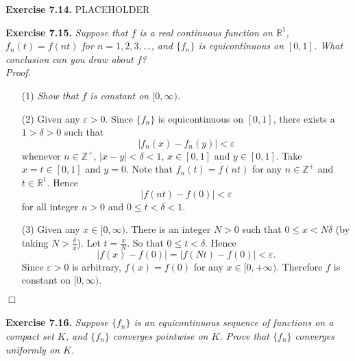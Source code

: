 \documentclass{article}
\begin{document}



\textbf{Exercise 7.14.}
PLACEHOLDER






\textbf{Exercise 7.15.}
\emph{Suppose that $f$ is a real continuous function on $\mathbb{R}^1$,
$f_n(t)= f(nt)$ for $n=1,2,3,\ldots$,
and $\{f_n\}$ is equicontinuous on $[0,1]$.
What conclusion can you draw about $f$?} \\

\emph{Proof.}
\begin{enumerate}
\item[(1)]
  \emph{Show that $f$ is constant on $[0,\infty)$.}

\item[(2)]
  Given any $\varepsilon > 0$.
  Since $\{f_n\}$ is equicontinuous on $[0,1]$,
  there exists a $1 > \delta > 0$ such that
  \[
    |f_n(x)-f_n(y)| < \varepsilon
  \]
  whenever $n \in \mathbb{Z}^{+}$, $|x-y| < \delta < 1$, $x \in [0,1]$ and $y \in [0,1]$.
  Take $x = t \in [0,1]$ and $y = 0$.
  Note that $f_n(t) = f(nt)$ for any $n \in \mathbb{Z}^{+}$ and
  $t \in \mathbb{R}^1$.
  Hence
  \[
    |f(nt) - f(0)| < \varepsilon
  \]
  for all integer $n > 0$ and $0 \leq t < \delta < 1$.

\item[(3)]
  Given any $x \in [0,\infty)$.
  There is an integer $N > 0$ such that $0 \leq x < N\delta$
  (by taking $N > \frac{\delta}{x}$).
  Let $t = \frac{x}{N}$.
  So that $0 \leq t < \delta$.
  Hence
  \[
    |f(x) - f(0)| = |f(Nt) - f(0)| < \varepsilon.
  \]
  Since $\varepsilon > 0$ is arbitrary,
  $f(x) = f(0)$ for any $x \in [0,+\infty)$.
  Therefore $f$ is constant on $[0,\infty)$.
\end{enumerate}
$\Box$ \\\\






\textbf{Exercise 7.16.}
\emph{Suppose $\{f_n\}$ is an equicontinuous sequence of functions on a compact set $K$,
and $\{f_n\}$ converges pointwise on $K$.
Prove that $\{f_n\}$ converges uniformly on $K$.} \\
\end{document}
